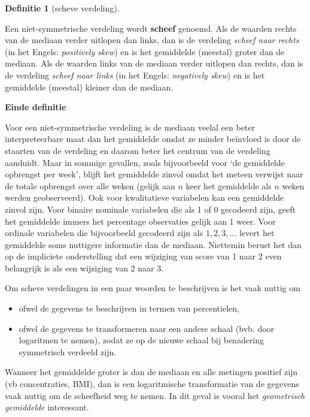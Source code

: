 \documentclass[
  12pt,dutch]{book}
\providecommand{\tightlist}{%
  \setlength{\itemsep}{0pt}\setlength{\parskip}{0pt}}
\theoremstyle{definition}
\newtheorem{definition}{Definitie}[chapter]
\theoremstyle{definition}
\theoremstyle{definition}
\theoremstyle{definition}
\theoremstyle{remark}
\begin{document}
\begin{definition}[scheve verdeling]
\protect\hypertarget{def:unnamed-chunk-98}{}\label{def:unnamed-chunk-98}~
\end{definition}

Een niet-symmetrische verdeling wordt \textbf{scheef} genoemd. Als de
waarden rechts van de mediaan verder uitlopen dan links, dan is de verdeling
\emph{scheef naar rechts} (in het Engels: \emph{positively skew}) en is
het gemiddelde (meestal) groter dan de mediaan. Als de waarden links van de
mediaan verder uitlopen dan rechts, dan is de verdeling \emph{scheef naar
links} (in het Engels: \emph{negatively skew}) en is het gemiddelde
(meestal) kleiner dan de mediaan.

\textbf{Einde definitie}

Voor een niet-symmetrische verdeling is de mediaan veelal een beter
interpreteerbare maat dan het gemiddelde omdat ze minder beïnvloed is
door de staarten van de verdeling en daarom beter het centrum van de
verdeling aanduidt. Maar in sommige gevallen, zoals bijvoorbeeld voor `de
gemiddelde opbrengst per week', blijft het gemiddelde zinvol omdat het
meteen verwijst naar de totale opbrengst over alle weken (gelijk aan \(n\)
keer het gemiddelde als \(n\) weken werden geobserveerd). Ook voor
kwalitatieve variabelen kan een gemiddelde zinvol zijn. Voor binaire
nominale variabelen die als 1 of 0 gecodeerd zijn, geeft het gemiddelde
immers het percentage observaties gelijk aan 1 weer. Voor ordinale
variabelen die bijvoorbeeld gecodeerd zijn als \(1, 2, 3, ...\) levert het
gemiddelde soms nuttigere informatie dan de mediaan. Niettemin berust het
dan op de impliciete onderstelling dat een wijziging van score van 1 naar 2
even belangrijk is als een wijziging van 2 naar 3.

Om scheve verdelingen in een paar woorden te beschrijven is het vaak nuttig
om

\begin{itemize}
\tightlist
\item
  ofwel de gegevens te beschrijven in termen van percentielen,
\item
  ofwel de gegevens te transformeren naar een andere schaal (bvb. door
  logaritmen te nemen), zodat ze op de nieuwe schaal bij benadering
  symmetrisch verdeeld zijn.
\end{itemize}

Wanneer het gemiddelde groter is dan de mediaan en alle metingen positief zijn (vb concentraties, BMI), dan is een logaritmische
transformatie van de gegevens vaak nuttig om de scheefheid weg te nemen. In
dit geval is vooral het \emph{geometrisch gemiddelde} interessant.
\end{document}
